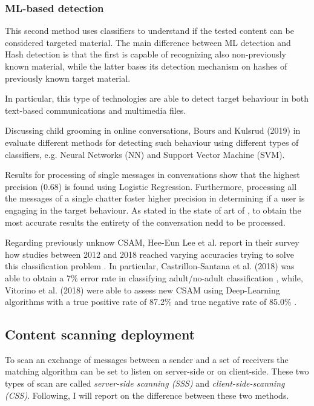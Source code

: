 \subsubsection{ML-based detection}
\label{sss:ML}

This second method uses classifiers to understand if the tested content can be considered targeted material. The main difference between ML detection and Hash detection is that the first is capable of recognizing also non-previously known material, while the latter bases its detection mechanism on hashes of previously known target material\cite{abelson2024bugs}. 

In particular, this type of technologies are able to detect target behaviour in both text-based communications and multimedia files.

Discussing child grooming in online conversations, Bours and Kulsrud (2019) in \cite{Bours} evaluate different methods for detecting such behaviour using different types of classifiers, e.g. Neural Networks (NN) and Support Vector Machine (SVM). 

Results for processing of single messages in conversations show that the highest precision (0.68) is found using Logistic Regression. Furthermore, processing all the messages of a single chatter foster higher precision in determining if a user is engaging in the target behaviour\cite{Bours}. As stated in the state of art of \cite{Bours}, to obtain the most accurate results the entirety of the conversation nedd to be processed.

Regarding previously unknow CSAM, Hee-Eun Lee et al. report in their survey how studies between 2012 and 2018 reached varying accuracies trying to solve this classification problem \cite{LEE2020301022}. In particular, Castrillon-Santana et al. (2018) was able to obtain a 7\% error rate in classifying adult/no-adult classification \cite{CASTRILLONSANTANA201810}, while, Vitorino et al. (2018) were able to assess new CSAM using Deep-Learning algorithms with a true positive rate of 87.2\% and true negative rate of 85.0\% \cite{VITORINO2018303}.

\subsection{Content scanning deployment}
\label{ss:scanning}

To scan an exchange of messages between a sender and a set of receivers the matching algorithm can be set to listen on server-side or on client-side. These two types of scan are called \textit{server-side scanning (SSS)} and \textit{client-side-scanning (CSS)}. Following, I will report on the difference between these two methods.


